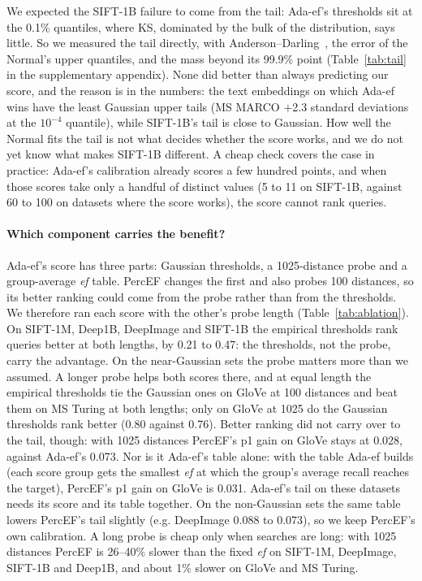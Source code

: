 \documentclass[sigconf,anonymous]{acmart}
\newcommand{\ef}{\textit{ef}}
\begin{document}
We expected the SIFT-1B failure to come from the tail: Ada-ef's thresholds sit at the 0.1\%
quantiles, where KS, dominated by the bulk of the distribution, says little. So we measured the tail
directly, with Anderson--Darling~\cite{anderson1952}, the error of the Normal's upper quantiles, and
the mass beyond its 99.9\% point (Table~\ref{tab:tail} in the supplementary appendix). None did better than
always predicting our score, and the reason is in the numbers: the text embeddings on which Ada-ef
wins have the least Gaussian upper tails (MS MARCO $+$2.3 standard deviations at the $10^{-4}$
quantile), while SIFT-1B's tail is close to Gaussian. How well the Normal fits the tail is not what
decides whether the score works, and we do not yet know what makes SIFT-1B different. A cheap
check covers the case in practice: Ada-ef's calibration already scores a few hundred points, and
when those scores take only a handful of distinct values (5 to 11 on SIFT-1B, against 60 to 100 on
datasets where the score works), the score cannot rank queries.

\paragraph{Which component carries the benefit?}\label{sec:ablation}
Ada-ef's score has three parts: Gaussian thresholds, a 1025-distance probe and a group-average \ef{}
table. PercEF changes the first and also probes 100 distances, so its better ranking could come from
the probe rather than from the thresholds. We therefore ran each score with the other's probe length
(Table~\ref{tab:ablation}). On SIFT-1M, Deep1B, DeepImage and SIFT-1B the empirical thresholds rank
queries better at both lengths, by 0.21 to 0.47: the thresholds, not the probe, carry the
advantage. On the near-Gaussian sets the probe matters more than we assumed. A longer probe helps
both scores there, and at equal length the empirical thresholds tie the Gaussian ones on GloVe at
100 distances and beat them on MS Turing at both lengths; only on GloVe at 1025 do the Gaussian
thresholds rank better (0.80 against 0.76). Better ranking did not carry over to the tail, though:
with 1025 distances PercEF's p1 gain on GloVe stays at 0.028, against Ada-ef's 0.073. Nor is it
Ada-ef's table alone: with the table Ada-ef builds (each score group gets the smallest \ef{} at which
the group's average recall reaches the target), PercEF's p1 gain on GloVe is 0.031. Ada-ef's tail
on these datasets needs its score and its table together. On the non-Gaussian sets the same table
lowers PercEF's tail slightly (e.g. DeepImage 0.088 to 0.073), so we keep PercEF's own calibration. A long probe is cheap only when searches are long: with 1025 distances
PercEF is 26--40\% slower than the fixed \ef{} on SIFT-1M, DeepImage, SIFT-1B and Deep1B, and about
1\% slower on GloVe and MS Turing.
\end{document}
